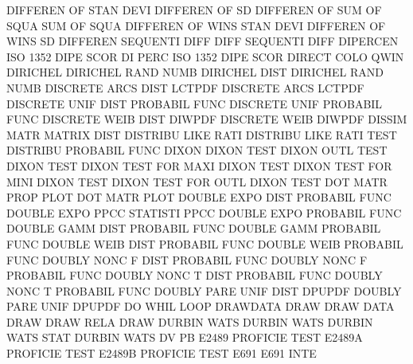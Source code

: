 DIFFEREN OF   STAN DEVI                 DIFFEREN OF   SD
DIFFEREN OF   SUM  OF   SQUA            SUM      OF   SQUA
DIFFEREN OF   WINS STAN DEVI            DIFFEREN OF   WINS SD
DIFFEREN                                SEQUENTI DIFF
DIFF                                    SEQUENTI DIFF
DIPERCEN                                ISO      1352 DIPE SCOR
DI       PERC                           ISO      1352 DIPE SCOR
DIRECT   COLO                           QWIN
DIRICHEL                                DIRICHEL RAND NUMB
DIRICHEL DIST                           DIRICHEL RAND NUMB
DISCRETE ARCS DIST                      LCTPDF
DISCRETE ARCS                           LCTPDF
DISCRETE UNIF DIST                      PROBABIL FUNC
DISCRETE UNIF                           PROBABIL FUNC
DISCRETE WEIB DIST                      DIWPDF
DISCRETE WEIB                           DIWPDF
DISSIM   MATR                           MATRIX   DIST
DISTRIBU LIKE RATI                      DISTRIBU LIKE RATI TEST
DISTRIBU                                PROBABIL FUNC
DIXON                                   DIXON    TEST
DIXON    OUTL TEST                      DIXON    TEST
DIXON    TEST FOR  MAXI                 DIXON    TEST
DIXON    TEST FOR  MINI                 DIXON    TEST
DIXON    TEST FOR  OUTL                 DIXON    TEST
DOT      MATR PROP PLOT                 DOT      MATR PLOT
DOUBLE   EXPO DIST                      PROBABIL FUNC
DOUBLE   EXPO PPCC                      STATISTI PPCC
DOUBLE   EXPO                           PROBABIL FUNC
DOUBLE   GAMM DIST                      PROBABIL FUNC
DOUBLE   GAMM                           PROBABIL FUNC
DOUBLE   WEIB DIST                      PROBABIL FUNC
DOUBLE   WEIB                           PROBABIL FUNC
DOUBLY   NONC F    DIST                 PROBABIL FUNC
DOUBLY   NONC F                         PROBABIL FUNC
DOUBLY   NONC T    DIST                 PROBABIL FUNC
DOUBLY   NONC T                         PROBABIL FUNC
DOUBLY   PARE UNIF DIST                 DPUPDF
DOUBLY   PARE UNIF                      DPUPDF
DO       WHIL                           LOOP
DRAWDATA                                DRAW
DRAW     DATA                           DRAW
DRAW     RELA                           DRAW
DURBIN   WATS                           DURBIN   WATS
DURBIN   WATS STAT                      DURBIN   WATS
DV                                      PB
E2489                                   PROFICIE TEST
E2489A                                  PROFICIE TEST
E2489B                                  PROFICIE TEST
E691                                    E691     INTE
